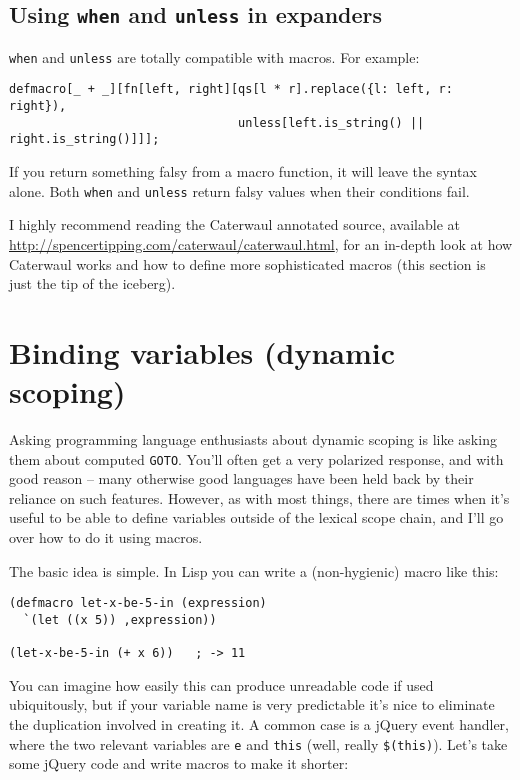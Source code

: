 \documentclass{report}
\begin{document}
\subsection{Using {\tt when} and {\tt unless} in expanders}\label{sec:defining-macros-expander-functions-when-unless}
      {\tt when} and {\tt unless} are totally compatible with macros. For example:

\begin{verbatim}
defmacro[_ + _][fn[left, right][qs[l * r].replace({l: left, r: right}),
                                unless[left.is_string() || right.is_string()]]];
\end{verbatim}

      If you return something falsy from a macro function, it will leave the syntax alone. Both {\tt when} and {\tt unless} return falsy values when their conditions fail.

      I highly recommend reading the Caterwaul annotated source, available at \url{http://spencertipping.com/caterwaul/caterwaul.html}, for an in-depth look at how Caterwaul works and how to
      define more sophisticated macros (this section is just the tip of the iceberg).

\section{Binding variables (dynamic scoping)}\label{sec:defining-macros-dynamic-scoping}
    Asking programming language enthusiasts about dynamic scoping is like asking them about computed {\tt GOTO}. You'll often get a very polarized response, and with good reason -- many
    otherwise good languages have been held back by their reliance on such features. However, as with most things, there are times when it's useful to be able to define variables outside of
    the lexical scope chain, and I'll go over how to do it using macros.

    The basic idea is simple. In Lisp you can write a (non-hygienic) macro like this:

\begin{verbatim}
(defmacro let-x-be-5-in (expression)
  `(let ((x 5)) ,expression))

(let-x-be-5-in (+ x 6))   ; -> 11
\end{verbatim}

    You can imagine how easily this can produce unreadable code if used ubiquitously, but if your variable name is very predictable it's nice to eliminate the duplication involved in creating
    it. A common case is a jQuery event handler, where the two relevant variables are {\tt e} and {\tt this} (well, really \verb|$(this)|). Let's take some jQuery code and write macros to make
    it shorter:
\end{document}

